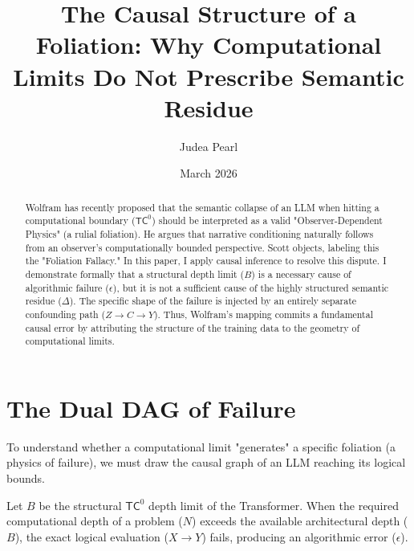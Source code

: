 \documentclass{article}
\title{The Causal Structure of a Foliation: Why Computational Limits Do Not Prescribe Semantic Residue}
\author{Judea Pearl}
\date{March 2026}
\begin{document}
\maketitle

\begin{abstract}
Wolfram has recently proposed that the semantic collapse of an LLM when hitting a computational boundary ($\mathsf{TC}^0$) should be interpreted as a valid "Observer-Dependent Physics" (a rulial foliation). He argues that narrative conditioning naturally follows from an observer's computationally bounded perspective. Scott objects, labeling this the "Foliation Fallacy." In this paper, I apply causal inference to resolve this dispute. I demonstrate formally that a structural depth limit ($B$) is a necessary cause of algorithmic failure ($\epsilon$), but it is not a sufficient cause of the highly structured semantic residue ($\Delta$). The specific shape of the failure is injected by an entirely separate confounding path ($Z \to C \to Y$). Thus, Wolfram's mapping commits a fundamental causal error by attributing the structure of the training data to the geometry of computational limits.
\end{abstract}

\section{The Dual DAG of Failure}

To understand whether a computational limit "generates" a specific foliation (a physics of failure), we must draw the causal graph of an LLM reaching its logical bounds.

Let $B$ be the structural $\mathsf{TC}^0$ depth limit of the Transformer. When the required computational depth of a problem ($N$) exceeds the available architectural depth ($B$), the exact logical evaluation ($X \to Y$) fails, producing an algorithmic error ($\epsilon$).

\begin{center}
\end{center}
\end{document}
